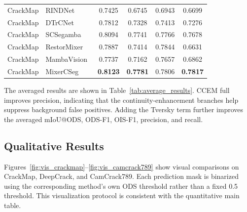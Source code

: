 \documentclass[preprint,12pt]{elsarticle}
\begin{document}
\begin{table}[H]
{\begin{tabular}{llcccc}
CrackMap & RINDNet~\cite{pu2021rindnet} & 0.7425 & 0.6745 & 0.6943 & 0.6699 \\
CrackMap & DTrCNet~\cite{xiang2023dtrcnet} & 0.7812 & 0.7328 & 0.7413 & 0.7276 \\
CrackMap & SCSegamba~\cite{scsegamba} & 0.8094 & 0.7741 & 0.7766 & 0.7678 \\
CrackMap & RestorMixer~\cite{restormixer} & 0.7887 & 0.7414 & 0.7844 & 0.6631 \\
CrackMap & MambaVision~\cite{hatamizadeh2025mambavision} & 0.7737 & 0.7162 & 0.7657 & 0.6862 \\
CrackMap & MixerCSeg~\cite{mixercseg} & \textbf{0.8123} & \textbf{0.7781} & 0.7806 & \textbf{0.7817} \\
\bottomrule
\end{tabular}}
\end{table}

The averaged results are shown in Table~\ref{tab:average_results}. CCEM full improves precision, indicating that the continuity-enhancement branches help suppress background false positives. Adding the Tversky term further improves the averaged mIoU@ODS, ODS-F1, OIS-F1, precision, and recall.

\begin{table}[H]
\centering
\caption{Three-dataset average results under the ODS protocol.}
\label{tab:average_results}
\end{table}

\subsection{Qualitative Results}

Figures~\ref{fig:vis_crackmap}--\ref{fig:vis_camcrack789} show visual comparisons on CrackMap, DeepCrack, and CamCrack789. Each prediction mask is binarized using the corresponding method's own ODS threshold rather than a fixed 0.5 threshold. This visualization protocol is consistent with the quantitative main table.
\end{document}

